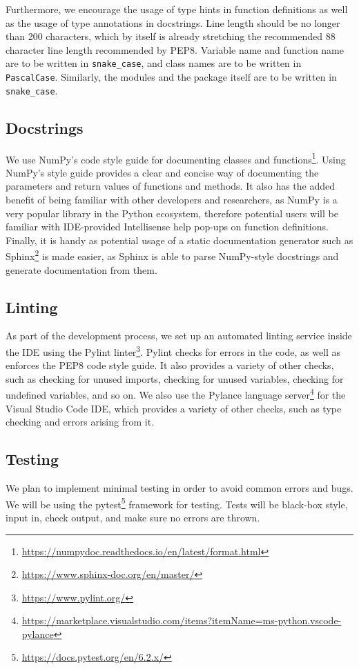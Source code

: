 Furthermore, we encourage the usage of type hints in function definitions as well as the usage of type annotations in docstrings. Line length should be no longer than 200 characters, which by itself is already stretching the recommended 88 character line length recommended by PEP8. Variable name and function name are to be written in \texttt{snake\_case}, and class names are to be written in \texttt{PascalCase}. Similarly, the modules and the package itself are to be written in \texttt{snake\_case}.

\subsection{Docstrings}
We use NumPy's code style guide for documenting classes and functions\footnote{\url{https://numpydoc.readthedocs.io/en/latest/format.html}}. Using NumPy's style guide provides a clear and concise way of documenting the parameters and return values of functions and methods. It also has the added benefit of being familiar with other developers and researchers, as NumPy is a very popular library in the Python ecosystem, therefore potential users will be familiar with IDE-provided Intellisense help pop-ups on function definitions. Finally, it is handy as potential usage of a static documentation generator such as Sphinx\footnote{\url{https://www.sphinx-doc.org/en/master/}} is made easier, as Sphinx is able to parse NumPy-style docstrings and generate documentation from them.

\subsection{Linting}
As part of the development process, we set up an automated linting service inside the IDE using the Pylint linter\footnote{\url{https://www.pylint.org/}}. Pylint checks for errors in the code, as well as enforces the PEP8 code style guide. It also provides a variety of other checks, such as checking for unused imports, checking for unused variables, checking for undefined variables, and so on. We also use the Pylance language server\footnote{\url{https://marketplace.visualstudio.com/items?itemName=ms-python.vscode-pylance}} for the Visual Studio Code IDE, which provides a variety of other checks, such as type checking and errors arising from it.

\subsection{Testing}
We plan to implement minimal testing in order to avoid common errors and bugs. We will be using the pytest\footnote{\url{https://docs.pytest.org/en/6.2.x/}} framework for testing. Tests will be black-box style, input in, check output, and make sure no errors are thrown. 

